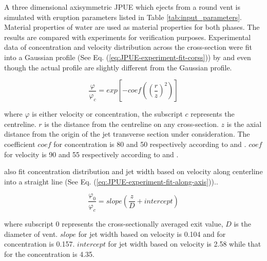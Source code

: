 \documentclass[gmd, manuscript]{copernicus}
\begin{document}
A three dimensional axisymmetric JPUE which ejects from a round vent is simulated with eruption parameters listed in Table \ref{tab:input_parameters}. Material properties of water are used as material properties for both phases. The results are compared with experiments \citep {george1977turbulence, papanicolaou1988investigations} for verification purposes. Experimental data of concentration and velocity distribution across the cross-section were fit into a Gaussian profile (See Eq. (\ref{eq:JPUE-experiment-fit-corss})) by \citet{papanicolaou1988investigations} and  \citet{ george1977turbulence} even though the actual profile are slightly different from the Gaussian profile.

\begin{equation}
\dfrac{\varphi}{\varphi_c}=exp \left[-coef\left( \left(\dfrac{r}{z}\right)^2\right)\right]
\label{eq:JPUE-experiment-fit-corss}
\end{equation}

where $\varphi$ is either velocity or concentration, the subscript $c$ represents the centreline. $r$ is the distance from the centreline on any cross-section. $z$ is the axial distance from the origin of the jet transverse section under consideration. 
The coefficient $coef$ for concentration is 80 and 50 respectively according to \citet{george1977turbulence} and \citet{papanicolaou1988investigations}.
$coef$ for velocity is 90 and 55 respectively according to \citet{george1977turbulence} and \citet{papanicolaou1988investigations}. 

\citet{papanicolaou1988investigations} also fit concentration distribution and jet width based on velocity along centerline into a straight line (See Eq. (\ref{eq:JPUE-experiment-fit-along-axis})).. 

\begin{equation}
\dfrac{\varphi_0}{\varphi_c}=slope \left(\dfrac{z}{D} + intercept \right)
\label{eq:JPUE-experiment-fit-along-axis}
\end{equation}

where subscript $0$ represents the cross-sectionally averaged exit value, $D$ is the diameter of vent. 
$slope$ for jet width based on velocity is 0.104 and for concentration is 0.157. 
$intercept$ for jet width based on velocity is 2.58 while that for the concentration is 4.35.
\end{document}
